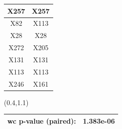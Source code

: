 \documentclass{beamer}
\newcommand{\boz}{\cellcolor{pathwaynode}}
\newcommand{\ghool}{\cellcolor{independentnode}}
\begin{document}
\begin{frame}[plain]
\begin{textblock*}{\paperwidth}
\begin{tabular}{| c c |}
\ghool X257   &  \ghool X257  \\ \hline
\boz X82   &  \boz X113  \\ \hline
X28   &  X28  \\ \hline
\boz X272   &  X205  \\ \hline
X131   &  X131  \\ \hline
\boz X113   &  \boz X113  \\ \hline
X246   &  X161  \\ \hline
    \end{tabular}
    \hspace{.5em}
  \end{textblock*}
  \begin{textblock*}{\paperwidth}(0.4\textwidth,1.1\textheight)
    \raggedright 
    \tiny
    \begin{tabular}{| c c |}
      \hline
      wc p-value (paired): & 1.383e-06 \\ \hline
    \end{tabular}
    \hspace{.5em}
  \end{textblock*}
\end{frame}
\end{document}
